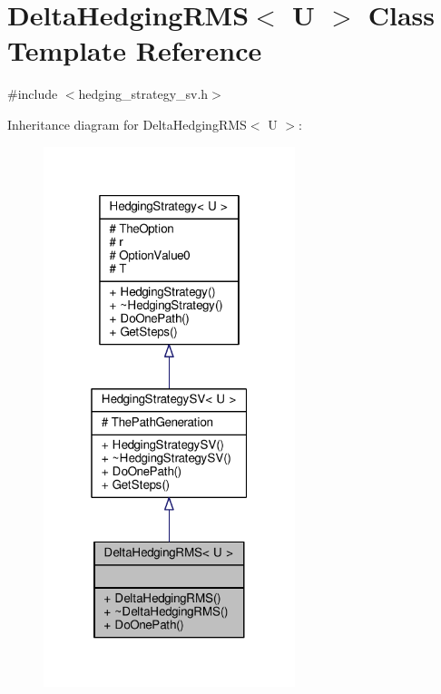 \hypertarget{classDeltaHedgingRMS}{}\section{Delta\+Hedging\+R\+MS$<$ U $>$ Class Template Reference}
\label{classDeltaHedgingRMS}


{\ttfamily \#include $<$hedging\+\_\+strategy\+\_\+sv.\+h$>$}



Inheritance diagram for Delta\+Hedging\+R\+MS$<$ U $>$\+:
\nopagebreak
\begin{figure}[H]
\begin{center}
\leavevmode
\includegraphics[width=208pt]{classDeltaHedgingRMS__inherit__graph}
\end{center}
\end{figure}


